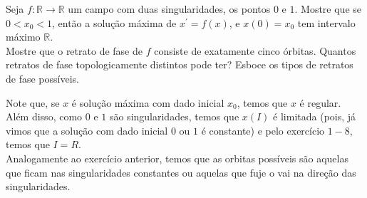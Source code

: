 \begin{homeworkProblem}[1-10]
  Seja $f : \mathbb{R} \to \mathbb{R}$ um campo com duas singularidades, os pontos $0$ e $1$. Mostre que se $0<x_0<1$, então a solução máxima de $x^{\prime} = f(x)$, e $x(0) = x_0$  tem intervalo máximo $\mathbb{R}$.\\
  Mostre que o retrato de fase de $f$ consiste de exatamente cinco órbitas. Quantos retratos de fase topologicamente distintos pode ter? Esboce os tipos de retratos de fase possíveis.
  \begin{solution}
    Note que, se $x$ é solução máxima com dado inicial $x_0$, temos que $x$ é regular. Além disso, como $0$ e $1$ são singularidades, temos que $x(I)$ é limitada (pois, já vimos que a solução com dado inicial $0$ ou $1$ é constante) e pelo exercício $1-8$, temos que $I=R$.\\
    Analogamente ao exercício anterior, temos que as orbitas possíveis são aquelas que ficam nas singularidades constantes ou aquelas que fuje o vai na direção das singularidades.
  \end{solution}
\end{homeworkProblem}
